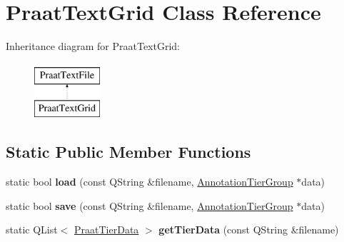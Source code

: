 \hypertarget{class_praat_text_grid}{}\section{Praat\+Text\+Grid Class Reference}
\label{class_praat_text_grid}
Inheritance diagram for Praat\+Text\+Grid\+:\begin{figure}[H]
\begin{center}
\leavevmode
\includegraphics[height=2.000000cm]{class_praat_text_grid}
\end{center}
\end{figure}
\subsection*{Static Public Member Functions}
\begin{DoxyCompactItemize}
\item 
\mbox{\label{class_praat_text_grid_a3b0776ed225ea4dd9dbf98a3361f6c7e}} 
static bool {\bfseries load} (const Q\+String \&filename, \hyperlink{class_annotation_tier_group}{Annotation\+Tier\+Group} $\ast$data)
\item 
\mbox{\label{class_praat_text_grid_ae90ba93cd1089020d2e171ac8bc0c0b6}} 
static bool {\bfseries save} (const Q\+String \&filename, \hyperlink{class_annotation_tier_group}{Annotation\+Tier\+Group} $\ast$data)
\item 
\mbox{\label{class_praat_text_grid_a7df516e2b7462ad72ab5c67aa42941df}} 
static Q\+List$<$ \hyperlink{class_praat_tier_data}{Praat\+Tier\+Data} $>$ {\bfseries get\+Tier\+Data} (const Q\+String \&filename)
\end{DoxyCompactItemize}
